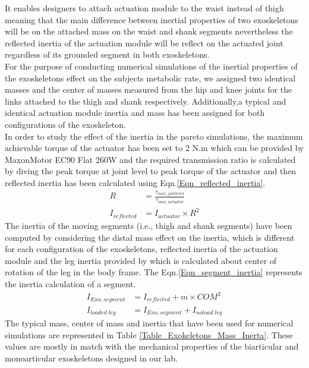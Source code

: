 \documentclass[10pt,letterpaper]{article}
\begin{document}
It enables designers to attach actuation module to the waist instead of thigh meaning that the main difference between inertial properties of two exoskeletons will be on the attached mass on the waist and shank segments nevertheless the reflected inertia of the actuation module will be reflect on the actuated joint regardless of its grounded segment in both exoskeletons.\\
For the purpose of conducting numerical simulations of the inertial properties of the exoskeletons effect on the subjects metabolic rate, we assigned two identical masses and the center of masses measured from the hip and knee joints for the links attached to the thigh and shank respectively. Additionally,a typical and identical actuation module inertia and mass has been assigned for both configurations of the exoskeleton.\\
In order to study the effect of the inertia in the pareto simulations, the maximum achievable torque of the actuator has been set to 2 N.m which can be provided by MaxonMotor EC90 Flat 260W and the required transmission ratio is calculated by diving the peak torque at joint level to peak torque of the actuator and then reflected inertia has been calculated using Eqn.\ref{Eqn_reflected_inertia}.\\
\begin{equation}\label{Eqn_reflected_inertia}
	\begin{aligned}
	R &= \frac{\tau_{max,jont level}}{\tau_{max,actuator}}\\
	I_{reflected} &= I_{actuator}\times R^{2}
	\end{aligned}
\end{equation}
The inertia of the moving segments (i.e., thigh and shank segments) have been computed by considering the distal mass effect on the inertia, which is different for each configuration of the exoskeletons, reflected inertia of the actuation module and the leg inertia provided by \cite{133} which is calculated about center of rotation of the leg in the body frame. The Eqn.\ref{Eqn_segment_inertia} represents the inertia calculation of a segment.
\begin{equation}\label{Eqn_segment_inertia}
\begin{aligned}
I_{Exo,segment} &= I_{reflected} + m\times COM^{2}\\
I_{loaded\;leg} &= I_{Exo,segment} + I_{noload\;leg}
\end{aligned}
\end{equation}
The typical mass, center of mass and inertia that have been used for numerical simulations are represented in Table \ref{Table_Exokeletons_Mass_Inerta}. These values are mostly in match with the mechanical properties of the biarticular and monoarticular exoskeletons designed in our lab.\\
\end{document}
